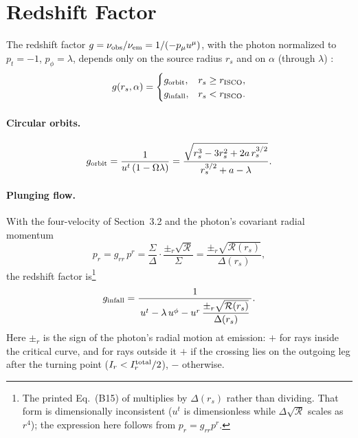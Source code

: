 \documentclass[11pt]{article}
\begin{document}
\section{Redshift Factor}

The redshift factor $g = \nu_{\rm obs}/\nu_{\rm em} = 1/(-p_\mu u^\mu)$, with
the photon normalized to $p_t = -1$, $p_\phi = \lambda$, depends only on the
source radius $r_s$ and on $\alpha$ (through $\lambda$) \cite{GLM2020}:
\begin{equation}
g(r_s,\alpha) =
\begin{cases}
g_{\rm orbit}, & r_s \ge r_{\rm ISCO}, \\
g_{\rm infall}, & r_s < r_{\rm ISCO}.
\end{cases}
\end{equation}

\paragraph{Circular orbits.}
\begin{equation}
g_{\rm orbit} = \frac{1}{u^t\left(1 - \Omega\lambda\right)}
= \frac{\sqrt{r_s^3 - 3r_s^2 + 2a\,r_s^{3/2}}}{r_s^{3/2} + a - \lambda}.
\end{equation}

\paragraph{Plunging flow.} With the four-velocity of Section~3.2 and the
photon's covariant radial momentum
\begin{equation}
p_r = g_{rr}\,p^r = \frac{\Sigma}{\Delta}\cdot\frac{\pm_r\sqrt{\mathcal{R}}}{\Sigma}
= \frac{\pm_r\sqrt{\mathcal{R}(r_s)}}{\Delta(r_s)},
\end{equation}
the redshift factor is\footnote{The printed Eq.~(B15) of \cite{GLM2020}
multiplies by $\Delta(r_s)$ rather than dividing. That form is dimensionally
inconsistent ($u^t$ is dimensionless while $\Delta\sqrt{\mathcal{R}}$ scales
as $r^4$); the expression here follows from $p_r = g_{rr}p^r$.}
\begin{equation}
g_{\rm infall} = \frac{1}{\,u^t - \lambda\,u^\phi - u^r\,\dfrac{\pm_r\sqrt{\mathcal{R}(r_s)}}{\Delta(r_s)}\,}.
\end{equation}
Here $\pm_r$ is the sign of the photon's radial motion at emission: $+$ for
rays inside the critical curve, and for rays outside it $+$ if the crossing
lies on the outgoing leg after the turning point ($I_r < I_r^{\rm total}/2$),
$-$ otherwise.
\end{document}
